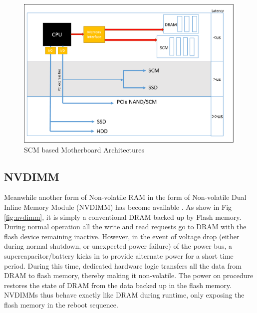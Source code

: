 \begin{figure}[H]
  \centering
  \includegraphics[scale=0.7]{figures/new_mem_arch.png}
  \caption[SCM based Motherboard Architectures]{SCM based Motherboard Architectures \cite{mother_archi}}
  \label{fig:new_arch}
\end{figure}

\subsection{NVDIMM}
Meanwhile another form of Non-volatile RAM in the form of Non-volatile Dual Inline Memory Module (NVDIMM) has become available \cite{nvdimm}. As show in Fig \ref{fig:nvdimm}, it is simply a conventional DRAM backed up by Flash memory. During normal operation all the write and read requests go to DRAM with the flash device remaining inactive. However, in the event of voltage drop (either during normal shutdown, or unexpected power failure) of the power bus, a supercapacitor/battery kicks in to provide alternate power for a short time period. During this time, dedicated hardware logic transfers all the data from DRAM to flash memory, thereby making it non-volatile. The power on procedure restores the state of DRAM from the data backed up in the flash memory. NVDIMMs thus behave exactly like DRAM during runtime, only exposing the flash memory in the reboot sequence. 

\setlength{\belowcaptionskip}{-10pt}


